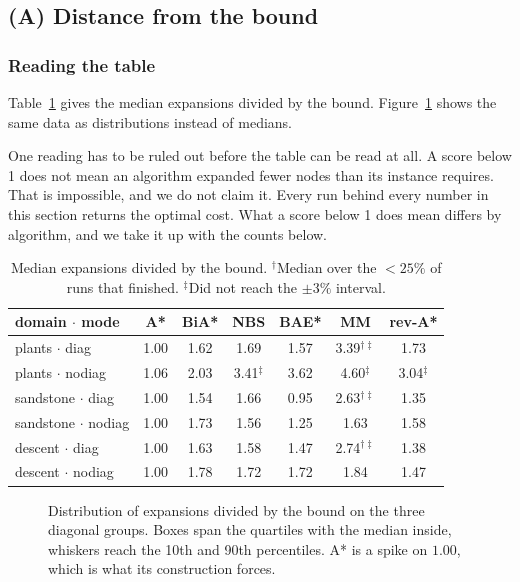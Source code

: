 \documentclass[letterpaper]{article} %
\begin{document}
\subsection{(A) Distance from the bound}

\subsubsection{Reading the table}
Table~\ref{tab:expfloor} gives the median expansions divided by the bound. Figure~\ref{fig:expfloor} shows the same data as distributions instead of medians.

One reading has to be ruled out before the table can be read at all. A score below 1 does not mean an algorithm expanded fewer nodes than its instance requires. That is impossible, and we do not claim it. Every run behind every number in this section returns the optimal cost. What a score below 1 does mean differs by algorithm, and we take it up with the counts below.

\begin{table}[t] \centering\small \setlength{\tabcolsep}{3pt}
  \begin{tabular}{lcccccc} \toprule domain $\cdot$ mode & A* & BiA* & NBS & BAE* & MM & rev-A* \\ \midrule plants $\cdot$ diag & 1.00 & 1.62 & 1.69 & 1.57 & 3.39$^{\dagger\ddagger}$ & 1.73 \\ plants $\cdot$ nodiag & 1.06 & 2.03 & 3.41$^\ddagger$ & 3.62 & 4.60$^\ddagger$ & 3.04$^\ddagger$ \\ \addlinespace[2pt] sandstone $\cdot$ diag & 1.00 & 1.54 & 1.66 & 0.95 & 2.63$^{\dagger\ddagger}$ & 1.35 \\ sandstone $\cdot$ nodiag & 1.00 & 1.73 & 1.56 & 1.25 & 1.63 & 1.58 \\ \addlinespace[2pt] descent $\cdot$ diag & 1.00 & 1.63 & 1.58 & 1.47 & 2.74$^{\dagger\ddagger}$ & 1.38 \\ descent $\cdot$ nodiag & 1.00 & 1.78 & 1.72 & 1.72 & 1.84 & 1.47 \\ \bottomrule
  \end{tabular}
  \caption{Median expansions divided by the bound. $^\dagger$Median over the $<25\%$ of runs that finished. $^\ddagger$Did not reach the $\pm3\%$ interval.}\label{tab:expfloor}
\end{table}

\begin{figure}[t] \centering
  
  \caption{Distribution of expansions divided by the bound on the three diagonal groups. Boxes span the quartiles with the median inside, whiskers reach the 10th and 90th percentiles. A* is a spike on $1.00$, which is what its construction forces.}\label{fig:expfloor}
\end{figure}
\end{document}
